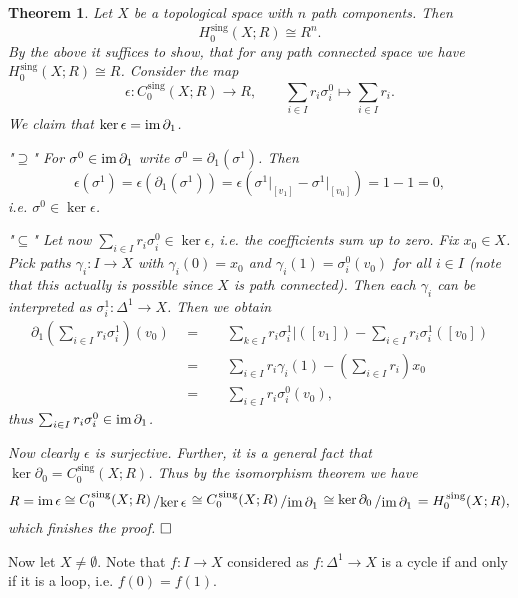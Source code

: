 \documentclass[11pt]{book}
\numberwithin{dummy}{section}
\newtheorem{theorem}{Theorem}[section]
\theoremstyle{nonumberbreak}
\newenvironment{pr}[1][]{\ifthenelse{\equal{#1}{}}{\proof}{\proof[#1]}\rm}{\endproof}
\newcommand{\im}{\mathrm{im} \hspace{1.5pt}}
\newcommand{\la}{\longrightarrow}
\newcommand{\Cs}{C^{\hspace{1pt}\mathrm{sing}}}
\newcommand{\Hs}{H^{\hspace{1pt}\mathrm{sing}}}
\newcommand{\slant}[2]{{\raisebox{.1em}{$#1$}\left/\raisebox{-.1em}{$#2$}\right.}}
\begin{document}
\begin{spacing}{1.4}
\begin{theorem}
Let $X$ be a topological space with $n$ path components. Then 
$$\Hs_0(X;R) \cong R^n.$$
\begin{pr}
By the above it suffices to show, that for any path connected space we have $\Hs_0(X;R) \cong R$. Consider the map
$$\epsilon: \Cs_0(X;R)  \la R, \qquad \sum_{i \in I} r_i \sigma_{i}^{0} \mapsto \sum_{i \in I} r_i.$$
We claim that $\ker \epsilon = \im \partial_1$.
\begin{compactenum}
\item["$\supseteq$"] For $\sigma^0 \in \im \partial_1$ write $\sigma^0 = \partial_1(\sigma^1)$. Then 
$$\epsilon(\sigma^1)=\epsilon\left( \partial_1(\sigma^1)\right)= \epsilon \left( \sigma^1\vert_{[v_1]} - \sigma^1 \vert_{[v_0]} \right) = 1-1 = 0,$$
i.e. $\sigma^0 \in \ker \epsilon$.
\item["$\subseteq$"] Let now $\sum_{i \in I} r_i \sigma_i^{0} \in \ker \epsilon$, i.e. the coefficients sum up to zero. Fix $x_0 \in X$. Pick paths $\gamma_i: I \la X$ with $\gamma_i(0) = x_0$ and $\gamma_i(1) = \sigma_i^{0}(v_0)$ for all $i \in I$ (note that this actually is possible since $X$ is path connected). Then each $\gamma_i$ can be interpreted as $\sigma_i^{1}: \Delta^1 \la X$. Then we obtain 
\begin{alignat*}{5}
\partial_1 \left( \sum_{i \in I} r_i \sigma_i^{1} \right)(v_0) \ \ &=&& \ \ \sum_{k \in I} r_i \sigma_i^{1}\vert([v_1]) - \sum_{i \in I} r_i \sigma_i^{1}([v_0]) \\
&=&& \ \ \sum_{i \in I} r_i \gamma_i(1) - \left( \sum_{i \in I} r_i \right) x_0 \\
&=&& \ \ \sum_{i \in I} r_i \sigma_i^{0}(v_0),
\end{alignat*}
thus $\sum_{i \in I} r_i \sigma_i^{0} \in \im \partial_1$.

\end{compactenum}
Now clearly $\epsilon$ is surjective. Further, it is a general fact that $\ker \partial_0 = \Cs_0(X;R)$. Thus by the isomorphism theorem we have
$$R = \im \epsilon \cong \slant{\Cs_0(X;R)}{\ker \epsilon} \cong \slant{\Cs_0(X;R)}{\im \partial_1} \cong \slant{\ker \partial_0}{\im \partial_1} = \Hs_0(X;R),$$
which finishes the proof. $\hfill \Box$

\end{pr}

\end{theorem}


Now let $X \neq \emptyset$. Note that $f: I \la X$ considered as $f: \Delta^1 \la X$ is a cycle if and only if it is a loop, i.e. $f(0) = f(1)$. 



\end{spacing}
\end{document}
